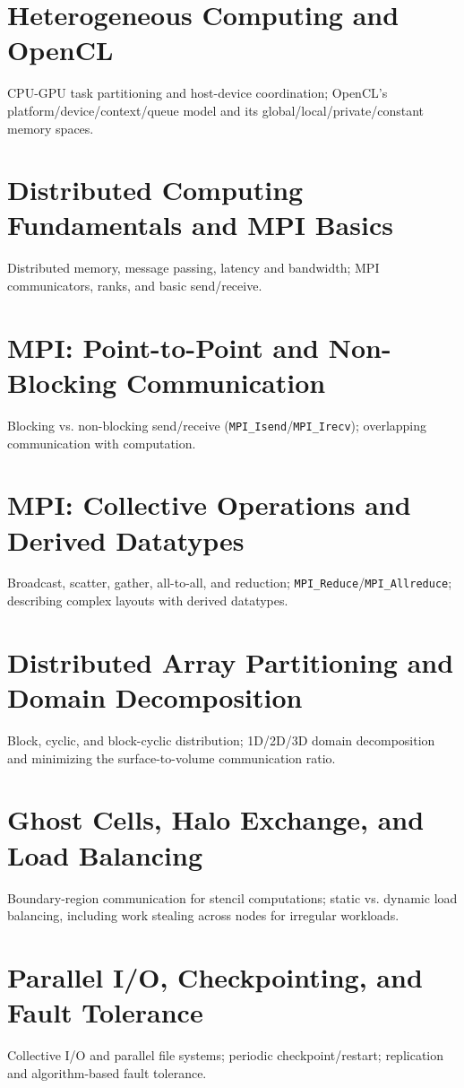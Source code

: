 \chapter{Heterogeneous Computing and OpenCL}
CPU-GPU task partitioning and host-device coordination; OpenCL's platform/device/context/queue model and its global/local/private/constant memory spaces.

\chapter{Distributed Computing Fundamentals and MPI Basics}
Distributed memory, message passing, latency and bandwidth; MPI communicators, ranks, and basic send/receive.

\chapter{MPI: Point-to-Point and Non-Blocking Communication}
Blocking vs. non-blocking send/receive (\texttt{MPI\_Isend}/\texttt{MPI\_Irecv}); overlapping communication with computation.

\chapter{MPI: Collective Operations and Derived Datatypes}
Broadcast, scatter, gather, all-to-all, and reduction; \texttt{MPI\_Reduce}/\texttt{MPI\_Allreduce}; describing complex layouts with derived datatypes.

\chapter{Distributed Array Partitioning and Domain Decomposition}
Block, cyclic, and block-cyclic distribution; 1D/2D/3D domain decomposition and minimizing the surface-to-volume communication ratio.

\chapter{Ghost Cells, Halo Exchange, and Load Balancing}
Boundary-region communication for stencil computations; static vs. dynamic load balancing, including work stealing across nodes for irregular workloads.

\chapter{Parallel I/O, Checkpointing, and Fault Tolerance}
Collective I/O and parallel file systems; periodic checkpoint/restart; replication and algorithm-based fault tolerance.


